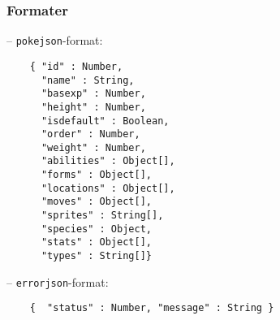 \documentclass[leqno,12pt]{article}
\begin{document}
\subsubsection*{Formater}
 -- \texttt{pokejson}-format:
\begin{listing}[ht!]
\begin{verbatim}
    { "id" : Number,
      "name" : String,
      "basexp" : Number,
      "height" : Number,
      "isdefault" : Boolean,
      "order" : Number,
      "weight" : Number,
      "abilities" : Object[], 
      "forms" : Object[],
      "locations" : Object[],
      "moves" : Object[],
      "sprites" : String[],
      "species" : Object,
      "stats" : Object[],
      "types" : String[]}
\end{verbatim}
\end{listing}

 -- \texttt{errorjson}-format:
\begin{listing}[ht!]
\begin{verbatim}
    {  "status" : Number, "message" : String }
\end{verbatim}
\end{listing}
\end{document}
